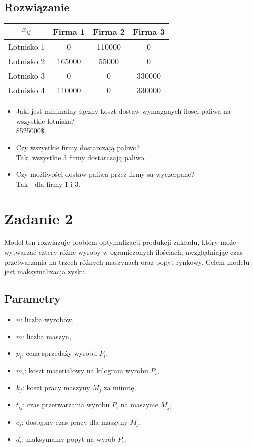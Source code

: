\documentclass[12pt, letterpaper]{article}
\begin{document}
\subsection{Rozwiązanie}
\begin{center}
  \begin{tabular}{|c|c|c|c|}
    \hline
    \( x_{ij} \) & Firma 1 & Firma 2 & Firma 3 \\
    \hline
    Lotnisko 1   & 0       & 110000  & 0       \\
    Lotnisko 2   & 165000  & 55000   & 0       \\
    Lotnisko 3   & 0       & 0       & 330000  \\
    Lotnisko 4   & 110000  & 0       & 330000  \\
    \hline
  \end{tabular}
\end{center}

\begin{itemize}
  \item Jaki jest minimalny łączny koszt dostaw wymaganych ilosci paliwa na
        wszystkie lotniska? \\ 8525000\$
  \item Czy wszystkie firmy dostarczają paliwo? \\ Tak, wszystkie 3 firmy
        dostarczają paliwo.
  \item Czy możliwości dostaw paliwa przez firmy są wyczerpane? \\ Tak - dla
        firmy 1 i 3.
\end{itemize}

\section{Zadanie 2}

Model ten rozwiązuje problem optymalizacji produkcji zakładu, który może
wytwarzać cztery różne wyroby w ograniczonych ilościach, uwzględniając czas
przetwarzania na trzech różnych maszynach oraz popyt rynkowy. Celem modelu jest
maksymalizacja zysku.

\subsection{Parametry}
\begin{itemize}
  \item \( n \): liczba wyrobów,
  \item \( m \): liczba maszyn,
  \item \( p_i \): cena sprzedaży wyrobu \( P_i \),
  \item \( m_i \): koszt materiałowy na kilogram wyrobu \( P_i \),
  \item \( k_j \): koszt pracy maszyny \( M_j \) za minutę,
  \item \( t_{ij} \): czas przetwarzania wyrobu \( P_i \) na maszynie \( M_j
        \),
  \item \( c_j \): dostępny czas pracy dla maszyny \( M_j \),
  \item \( d_i \): maksymalny popyt na wyrób \( P_i \).
\end{itemize}
\end{document}
